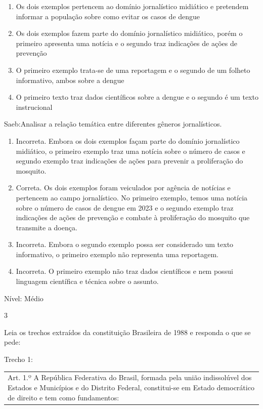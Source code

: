 {\begin{enumerate}
\def\labelenumi{\alph{enumi})}
\item
  Os dois exemplos pertencem ao domínio jornalístico midiático e
  pretendem informar a população sobre como evitar os casos de dengue
\item
  Os dois exemplos fazem parte do domínio jornalístico midiático, porém
  o primeiro apresenta uma notícia e o segundo traz indicações de ações
  de prevenção
\item
  O primeiro exemplo trata-se de uma reportagem e o segundo de um
  folheto informativo, ambos sobre a dengue
\item
  O primeiro texto traz dados científicos sobre a dengue e o segundo é
  um texto instrucional
\end{enumerate}

Saeb:Analisar a relação temática entre diferentes gêneros jornalísticos.

\begin{enumerate}
\def\labelenumi{\arabic{enumi}.}
\item
  Incorreta. Embora os dois exemplos façam parte do domínio jornalístico
  midiático, o primeiro exemplo traz uma notícia sobre o número de casos
  e segundo exemplo traz indicações de ações para prevenir a
  proliferação do mosquito.
\item
  Correta. Os dois exemplos foram veiculados por agência de notícias e
  pertencem ao campo jornalístico. No primeiro exemplo, temos uma
  notícia sobre o número de casos de dengue em 2023 e o segundo exemplo
  traz indicações de ações de prevenção e combate à proliferação do
  mosquito que transmite a doença.
\item
  Incorreta. Embora o segundo exemplo possa ser considerado um texto
  informativo, o primeiro exemplo não representa uma reportagem.
\item
  Incorreta. O primeiro exemplo não traz dados científicos e nem possui
  linguagem científica e técnica sobre o assunto.
\end{enumerate}

Nível: Médio

\num{3}

Leia os trechos extraídos da constituição Brasileira de 1988 e responda
o que se pede:

Trecho 1:

\begin{longtable}[]{@{}
  >{\raggedright\arraybackslash}p{}@{}}
\toprule
\endhead
Art. 1.º A República Federativa do Brasil, formada pela união
indissolúvel dos Estados e Municípios e do Distrito Federal,
constitui-se em Estado democrático de direito e tem como fundamentos:


\end{longtable}}
